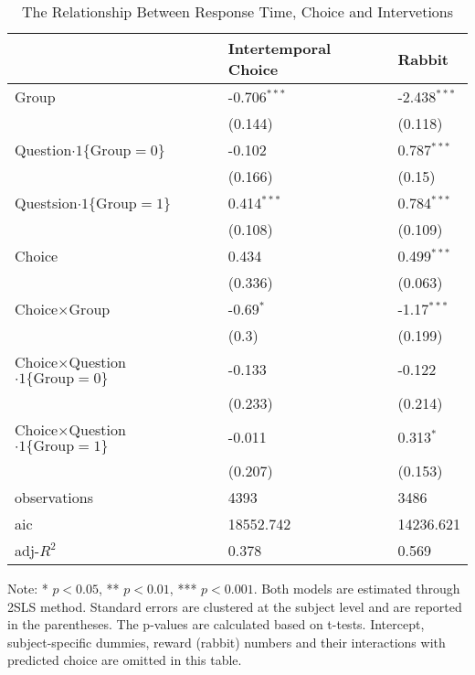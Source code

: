 \documentclass[12pt]{article}
\begin{document}
\begin{table}
    \caption{The Relationship Between Response Time, Choice and Intervetions}
    \vspace*{12pt}
    \centering

      \begin{tabular}{lll}
\hline
 & Intertemporal Choice & Rabbit \\
\hline
Group & -0.706$^{***}$ & -2.438$^{***}$ \\
 & (0.144) & (0.118) \\
Question$\cdot1\{\text{Group}=0\}$ & -0.102 & 0.787$^{***}$ \\
 & (0.166) & (0.15) \\
Questsion$\cdot1\{\text{Group}=1\}$ & 0.414$^{***}$ & 0.784$^{***}$ \\
 & (0.108) & (0.109) \\
Choice & 0.434 & 0.499$^{***}$ \\
 & (0.336) & (0.063) \\
Choice$\times$Group & -0.69$^{*}$ & -1.17$^{***}$ \\
 & (0.3) & (0.199) \\
Choice$\times$Question$\cdot1\{\text{Group}=0\}$ & -0.133 & -0.122 \\
 & (0.233) & (0.214) \\
Choice$\times$Question$\cdot1\{\text{Group}=1\}$ & -0.011 & 0.313$^{*}$ \\
 & (0.207) & (0.153) \\\hline

observations & 4393 & 3486 \\
aic & 18552.742 & 14236.621 \\
adj-$R^2$ & 0.378 & 0.569 \\
\hline
\end{tabular}

    \vspace*{4pt}
    \centering
    \begin{minipage}{0.85\textwidth}
    {\par\footnotesize Note: * $p<0.05$, ** $p<0.01$, *** $p<0.001$. Both models are estimated through 2SLS method. Standard errors are clustered at the subject level and are reported in the parentheses. The p-values are calculated based on t-tests. Intercept, subject-specific dummies, reward (rabbit) numbers and their interactions with predicted choice are omitted in this table.}
    \end{minipage}
    \label{tab:manipulate_response_time}
\end{table}
\end{document}
